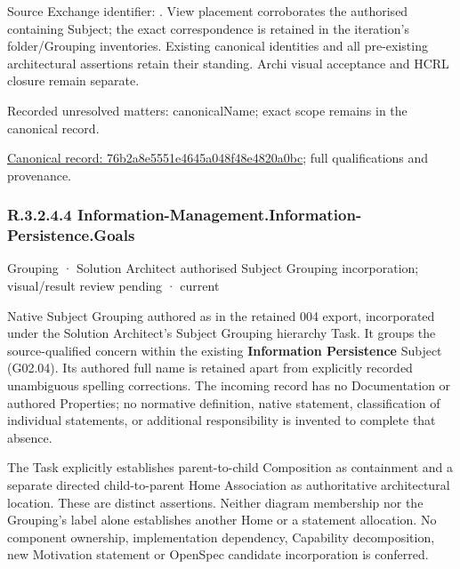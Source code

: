 Source Exchange identifier: \texttt{}. View placement corroborates
the authorised containing Subject; the exact correspondence is retained in the
iteration's folder/Grouping inventories. Existing canonical identities and all
pre-existing architectural assertions retain their standing. Archi visual
acceptance and HCRL closure remain separate.


{\small Recorded unresolved matters: canonicalName; exact scope remains in the canonical record.}\par
{\footnotesize \href{../../../../continuum/grouping/76b2a8e5551e4645a048f48e4820a0bc.md}{Canonical record: 76b2a8e5551e4645a048f48e4820a0bc}; full qualifications and provenance.}\par
\subsubsection*{R.3.2.4.4 Information-Management.Information-Persistence.Goals}
\label{navigation:R.3.2.4.4}

\label{element:e5d75469d336405a8f187368a7dc0353}
{\small Grouping · Solution Architect authorised Subject Grouping incorporation; visual/result review pending · current}\par

Native Subject Grouping authored as \texttt{} in the retained 004 export,
incorporated under the Solution Architect's Subject Grouping hierarchy Task.
It groups the source-qualified \texttt{} concern within
the existing \textbf{Information Persistence} Subject (G02.04). Its authored full name
is retained apart from explicitly recorded unambiguous spelling corrections.
The incoming record has no Documentation or authored Properties; no normative
definition, native statement, classification of individual statements, or
additional responsibility is invented to complete that absence.



The Task explicitly establishes parent-to-child Composition as containment and
a separate directed child-to-parent Home Association as authoritative architectural
location. These are distinct assertions. Neither diagram membership nor the
Grouping's label alone establishes another Home or a statement allocation.
No component ownership, implementation dependency, Capability decomposition,
new Motivation statement or OpenSpec candidate incorporation is conferred.



